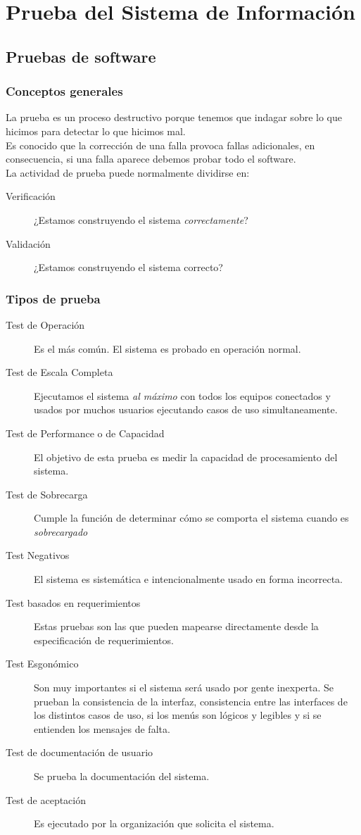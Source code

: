 \section{Prueba del Sistema de Información}
\subsection{Pruebas de software}
\subsubsection{Conceptos generales}
La prueba es un proceso destructivo porque tenemos que indagar sobre lo que hicimos para detectar lo que hicimos mal.\\
Es conocido que la corrección de una falla provoca fallas adicionales, en consecuencia, si una falla aparece debemos probar todo el software.\\
La actividad de prueba puede normalmente dividirse en:
\begin{description}
	\item[Verificación] ¿Estamos construyendo el sistema \emph{correctamente}?
	\item[Validación] ¿Estamos construyendo el sistema correcto?
\end{description}
\subsubsection{Tipos de prueba}
\begin{description}
	\item[Test de Operación] Es el más común. El sistema es probado en operación normal.
	\item[Test de Escala Completa] Ejecutamos el sistema \emph{al máximo} con todos los equipos conectados y usados por muchos usuarios ejecutando casos de uso simultaneamente.
	\item[Test de Performance o de Capacidad] El objetivo de esta prueba es medir la capacidad de procesamiento del sistema.
	\item[Test de Sobrecarga] Cumple la función de determinar cómo se comporta el sistema cuando es \emph{sobrecargado}
	\item[Test Negativos] El sistema es sistemática e intencionalmente usado en forma incorrecta.
	\item[Test basados en requerimientos] Estas pruebas son las que pueden mapearse directamente desde la especificación de requerimientos.
	\item[Test Esgonómico] Son muy importantes si el sistema será usado por gente inexperta. Se prueban la consistencia de la interfaz, consistencia entre las interfaces de los distintos casos de uso, si los menús son lógicos y legibles y si se entienden los mensajes de falta.
	\item[Test de documentación de usuario] Se prueba la documentación del sistema.
	\item[Test de aceptación] Es ejecutado por la organización que solicita el sistema.
\end{description}
